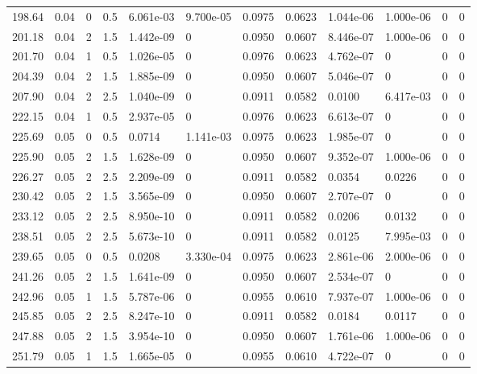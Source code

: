 \documentclass[preview]{standalone}
\begin{document}
{{{\begin{tabular}{L{1.2cm}C{1.2cm} C{0.3cm}C{0.5cm} C{1.4cm}C{1.4cm} C{1.4cm}C{1.4cm} C{1.6cm}C{1.6cm} C{1.6cm}C{1.6cm}}
  198.64  &  0.04  & 0     & 0.5 &  6.061e-03  & 9.700e-05  &  0.0975&   0.0623& 1.044e-06 & 1.000e-06   &  0 & 0  \\ 
  201.18  &  0.04  & 2     & 1.5 &  1.442e-09  & 0  &  0.0950&   0.0607& 8.446e-07 & 1.000e-06   &  0 & 0  \\ 
  201.70  &  0.04  & 1     & 0.5 &  1.026e-05  & 0  &  0.0976&   0.0623& 4.762e-07 & 0   &  0 & 0  \\ 
  204.39  &  0.04  & 2     & 1.5 &  1.885e-09  & 0  &  0.0950&   0.0607& 5.046e-07 & 0   &  0 & 0  \\ 
  207.90  &  0.04  & 2     & 2.5 &  1.040e-09  & 0  &  0.0911&   0.0582& 0.0100 & 6.417e-03   &  0 & 0  \\ 
  222.15  &  0.04  & 1     & 0.5 &  2.937e-05  & 0  &  0.0976&   0.0623& 6.613e-07 & 0   &  0 & 0  \\ 
  225.69  &  0.05  & 0     & 0.5 &  0.0714  & 1.141e-03  &  0.0975&   0.0623& 1.985e-07 & 0   &  0 & 0  \\ 
  225.90  &  0.05  & 2     & 1.5 &  1.628e-09  & 0  &  0.0950&   0.0607& 9.352e-07 & 1.000e-06   &  0 & 0  \\ 
  226.27  &  0.05  & 2     & 2.5 &  2.209e-09  & 0  &  0.0911&   0.0582& 0.0354 & 0.0226   &  0 & 0  \\ 
  230.42  &  0.05  & 2     & 1.5 &  3.565e-09  & 0  &  0.0950&   0.0607& 2.707e-07 & 0   &  0 & 0  \\ 
  233.12  &  0.05  & 2     & 2.5 &  8.950e-10  & 0  &  0.0911&   0.0582& 0.0206 & 0.0132   &  0 & 0  \\ 
  238.51  &  0.05  & 2     & 2.5 &  5.673e-10  & 0  &  0.0911&   0.0582& 0.0125 & 7.995e-03   &  0 & 0  \\ 
  239.65  &  0.05  & 0     & 0.5 &  0.0208  & 3.330e-04  &  0.0975&   0.0623& 2.861e-06 & 2.000e-06   &  0 & 0  \\ 
  241.26  &  0.05  & 2     & 1.5 &  1.641e-09  & 0  &  0.0950&   0.0607& 2.534e-07 & 0   &  0 & 0  \\ 
  242.96  &  0.05  & 1     & 1.5 &  5.787e-06  & 0  &  0.0955&   0.0610& 7.937e-07 & 1.000e-06   &  0 & 0  \\ 
  245.85  &  0.05  & 2     & 2.5 &  8.247e-10  & 0  &  0.0911&   0.0582& 0.0184 & 0.0117   &  0 & 0  \\ 
  247.88  &  0.05  & 2     & 1.5 &  3.954e-10  & 0  &  0.0950&   0.0607& 1.761e-06 & 1.000e-06   &  0 & 0  \\ 
  251.79  &  0.05  & 1     & 1.5 &  1.665e-05  & 0  &  0.0955&   0.0610& 4.722e-07 & 0   &  0 & 0  \\ 

\end{tabular}}}}
\end{document}
